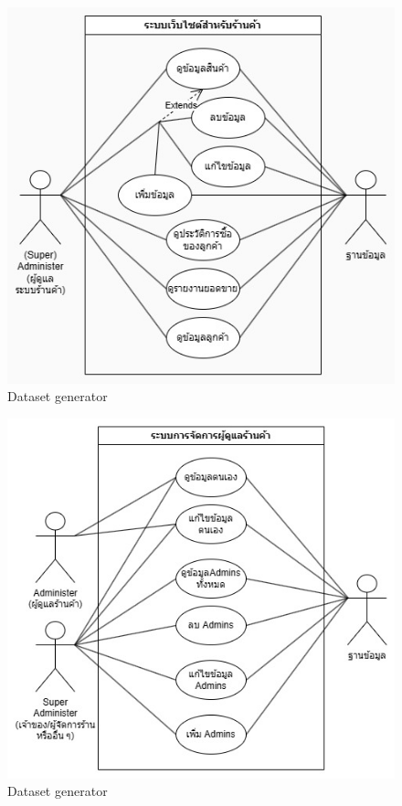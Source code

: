 \begin{figure}[h]
  \begin{center}

    \includegraphics[scale=0.5]{pic/diagram/usecase-web.jpg}
  \end{center}

  \caption[Dataset generator]{Dataset generator}
  \label{fig:Website Application Use Case Diagram}
\end{figure}
\begin{figure}[h]
  \begin{center}

    \includegraphics[scale=0.5]{pic/diagram/use-case-admin.jpg}
  \end{center}

  \caption[Dataset generator]{Dataset generator}
  \label{fig:Administer System Use Case Diagram}
\end{figure}

